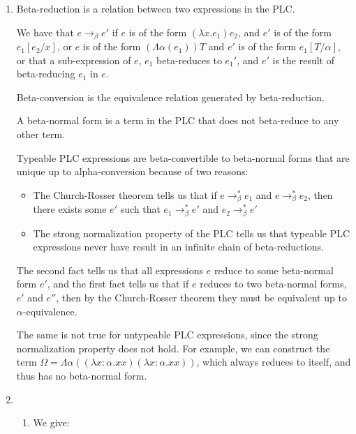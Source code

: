 


\begin{enumerate}[label=(\alph*)]
  \item
    Beta-reduction is a relation between two expressions in the PLC.

    We have that $e \rightarrow_\beta e'$ if $e$ is of the form $(\lambda x. e_1) e_2$, and $e'$ is of the form $e_1[e_2 / x]$, or $e$ is of the form $(\Lambda \alpha (e_1)) T$ and $e'$ is of the form $e_1[T / \alpha]$, or that a sub-expression of $e$, $e_1$ beta-reduces to $e_1'$, and $e'$ is the result of beta-reducing $e_1$ in $e$.

    Beta-conversion is the equivalence relation generated by beta-reduction.

    A beta-normal form is a term in the PLC that does not beta-reduce to any other term.

    Typeable PLC expressions are beta-convertible to beta-normal forms that are unique up to alpha-conversion because of two reasons:

    \begin{itemize}
      \item
        The Church-Rosser theorem tells us that if $e \rightarrow_\beta^* e_1$ and $e \rightarrow_\beta^* e_2$, then there exists some $e'$ such that $e_1 \rightarrow_\beta^* e'$ and $e_2 \rightarrow_\beta^* e'$

      \item
        The strong normalization property of the PLC tells us that typeable PLC expressions never have result in an infinite chain of beta-reductions.
    \end{itemize}

    The second fact tells us that all expressions $e$ reduce to some beta-normal form $e'$, and the first fact tells us that if $e$ reduces to two beta-normal forms, $e'$ and $e''$, then by the Church-Rosser theorem they must be equivalent up to $\alpha$-equivalence.

    The same is not true for untypeable PLC expressions, since the strong normalization property does not hold. For example, we can construct the term $\Omega = \Lambda \alpha ((\lambda x : \alpha. x x) (\lambda x : \alpha. x x))$, which always reduces to itself, and thus has no beta-normal form.

  \item
    \begin{enumerate}[label=(\roman*)]
      \item
        We give:


\end{enumerate}
\end{enumerate}
